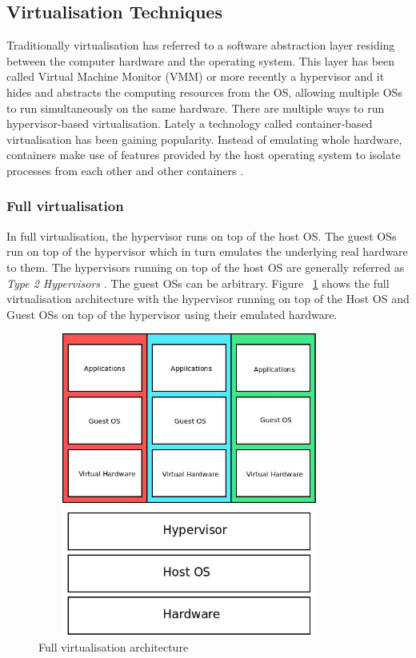 \subsection{Virtualisation Techniques}

Traditionally virtualisation has referred to a software abstraction layer residing between the computer hardware and the operating system. \cite{taxonomy} This layer has been called Virtual Machine Monitor (VMM) or more recently a hypervisor and it hides and abstracts the computing resources from the OS, allowing multiple OSs to run simultaneously on the same hardware. There are multiple ways to run hypervisor-based virtualisation. Lately a technology called container-based virtualisation has been gaining popularity. Instead of emulating whole hardware, containers make use of features provided by the host operating system to isolate processes from each other and other containers \cite{eder2016hypervisor}.

\subsubsection{Full virtualisation}

In full virtualisation, the hypervisor runs on top of the host OS. The guest OSs run on top of the hypervisor which in turn emulates the underlying real hardware to them. The hypervisors running on top of the host OS are generally referred as \textit{Type 2 Hypervisors} \cite{eder2016hypervisor}. The guest OSs can be arbitrary. Figure ~\ref{fig:full} shows the full virtualisation architecture with the hypervisor running on top of the Host OS and Guest OSs on top of the hypervisor using their emulated hardware. 

\begin{figure}[ht!]
\centering
  \includegraphics[width=10cm,height=10cm, keepaspectratio]{fullvirt.jpeg}%
  \caption{Full virtualisation architecture}
  \label{fig:full}
\end{figure}

